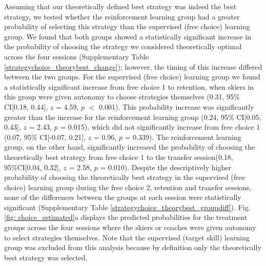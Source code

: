 \documentclass[pdflatex,sn-nature]{sn-jnl}%
\theoremstyle{thmstyleone}%
\theoremstyle{thmstyletwo}%
\theoremstyle{thmstylethree}%
\begin{document}
Assuming that our theoretically defined best strategy was indeed the best strategy, we tested whether the reinforcement learning group had a greater probability of selecting this strategy than the supervised (free choice) learning group. We found that both groups showed a statistically significant increase in the probability of choosing the strategy we considered theoretically optimal across the four sessions (Supplementary Table \ref{strategychoice_theorybest_change}); however, the timing of this increase differed between the two groups. For the supervised (free choice) learning group we found a statistically significant increase from free choice 1 to retention, when skiers in this group were given autonomy to choose strategies themselves (0.31, 95\% CI[0.18, 0.44], $z$ = 4.59, $p$ $<$ 0.001). This probability increase was significantly greater than the increase for the reinforcement learning group (0.24, 95\% CI[0.05, 0.43], $z$ = 2.43, $p$ = 0.015), which did not significantly increase from free choice 1 (0.07, 95\% CI[-0.07, 0.21], $z$ = 0.96, $p$ = 0.339). The reinforcement learning group, on the other hand, significantly increased the probability of choosing the theoretically best strategy from free choice 1  to the transfer session(0.18, 95\%CI[0.04, 0.32], $z$ = 2.58, $p$ = 0.010). Despite the descriptively higher probability of choosing the theoretically best strategy in the supervised (free choice) learning group during the free choice 2, retention and transfer sessions, none of the differences between the groups at each session were statistically significant (Supplementary Table \ref{strategychoice_theorybest_groupdiff}). Fig. \ref{fig: choice_estimated}a displays the predicted probabilities for the treatment groups across the four sessions where the skiers or coaches were given autonomy to select strategies themselves. Note that the supervised (target skill) learning group was excluded from this analysis because by definition only the theoretically best strategy was selected. 
\end{document}
